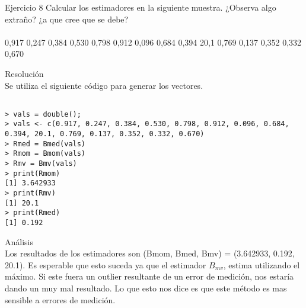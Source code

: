



\begin{section}{Ejercicio 8}
Calcular los estimadores en la siguiente muestra. ¿Observa algo extraño? ¿a que cree que se
debe? \\
~\\
0,917 0,247 0,384 0,530 0,798 0,912 0,096 0,684 0,394 20,1 0,769 0,137 0,352 0,332 0,670

\begin{subsection}{Resolución}~\\


Se utiliza el siguiente código para generar los vectores.
\begin{verbatim}

> vals = double();
> vals <- c(0.917, 0.247, 0.384, 0.530, 0.798, 0.912, 0.096, 0.684, 0.394, 20.1, 0.769, 0.137, 0.352, 0.332, 0.670)
> Rmed = Bmed(vals)
> Rmom = Bmom(vals)
> Rmv = Bmv(vals)
> print(Rmom)
[1] 3.642933
> print(Rmv)
[1] 20.1
> print(Rmed)
[1] 0.192
\end{verbatim}
\end{subsection}
\begin{subsection}{Análisis}~\\

Los resultados de los estimadores son (Bmom, Bmed, Bmv) = (3.642933, 0.192, 20.1). Es esperable que esto suceda ya que el estimador $B_{mv}$, estima utilizando el máximo. Si este fuera un outlier resultante de un error de medición, nos estaría dando un muy mal resultado. Lo que esto nos dice es que este método es mas sensible a errores de medición.


\end{subsection}
\end{section}